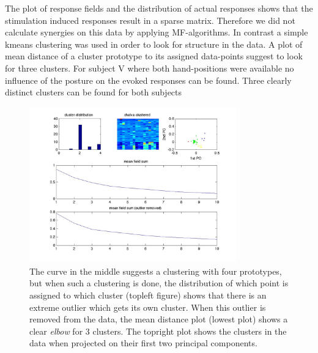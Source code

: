 The plot of response fields and the distribution of actual responses shows that the stimulation induced responses result in a sparse matrix. Therefore we did not calculate synergies on this data by applying MF-algorithms. In contrast a simple kmeans clustering was used in order to look for structure in the data. A plot of mean distance of a cluster prototype to its assigned data-points suggest to look for three clusters. For subject V where both hand-positions were available no influence of the posture on the evoked responses can be found. Three clearly distinct clusters can be found for both subjects
\begin{figure}[ht]
    \centering
        \includegraphics[width=0.8\textwidth]{images/raw_clusters_chalva.jpg}
    \caption{The curve in the middle suggests a clustering with four prototypes, but when such a clustering is done, the distribution of which point is assigned to which cluster (topleft figure) shows that there is an extreme outlier which gets its own cluster. When this outlier is removed from the data, the mean distance plot (lowest plot) shows a clear \emph{elbow} for 3 clusters. The topright plot shows the clusters in the data when projected on their first two principal components.}
    \label{sg:fig:images_raw_clusters_chalva}
\end{figure}
